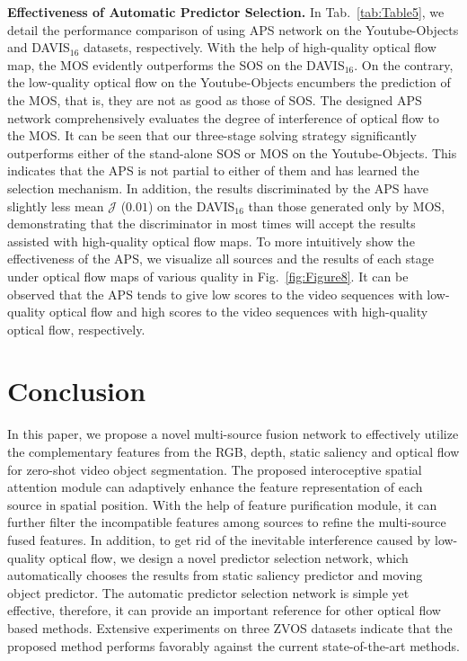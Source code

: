 \documentclass[sigconf]{acmart}
\begin{document}
\textbf{Effectiveness of Automatic Predictor Selection.} In Tab.~\ref{tab:Table5}, we detail the performance comparison of using APS network on the Youtube-Objects and DAVIS$_{16}$ datasets, respectively. With the help of high-quality optical flow map, the MOS evidently outperforms the SOS on the DAVIS$_{16}$. On the contrary, the low-quality optical flow on the Youtube-Objects encumbers the prediction of the MOS, that is, they are not as good as those of SOS. The designed APS network comprehensively evaluates the degree of interference of optical flow to the MOS. 
It can be seen that our three-stage solving strategy significantly outperforms either of the stand-alone SOS or MOS on the Youtube-Objects.
This indicates that the APS is not partial to either of them and has learned the selection mechanism.
In addition, the results discriminated by the APS have slightly less mean $\mathcal{J}$ ($0.01$) on the DAVIS$_{16}$ than those generated only by MOS, demonstrating that the discriminator in most times will accept the results assisted with high-quality optical flow maps.
To more intuitively show the effectiveness of the APS, we visualize all sources and the results of each stage under optical flow maps of various quality in Fig.~\ref{fig:Figure8}. It can be observed that the APS tends to give low scores to the video sequences with low-quality optical flow and high scores to the video sequences with high-quality optical flow, respectively.



\section{Conclusion}
In this paper, we propose a novel multi-source fusion network to effectively utilize the complementary features from the RGB, depth, static saliency and optical flow for zero-shot video object segmentation. The proposed interoceptive spatial attention module can adaptively enhance the feature representation of each source in spatial position. With the help of feature purification module, it can further filter the incompatible features among sources to refine the multi-source fused features. In addition, to get rid of the inevitable interference caused by low-quality optical flow, we design a novel predictor selection network, which automatically chooses the results from static saliency predictor and moving object predictor.
The automatic predictor selection network is simple yet effective, therefore, it can provide an important reference for other optical flow based methods. Extensive experiments on three ZVOS datasets indicate that the proposed method performs favorably against the current state-of-the-art methods.
\end{document}
